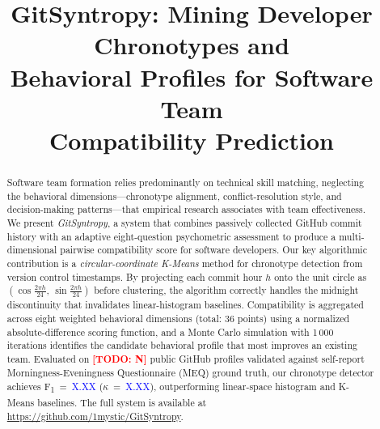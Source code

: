 \documentclass[conference]{IEEEtran}
\newcommand{\TODO}[1]{\textcolor{red}{\textbf{[TODO: #1]}}}
\newcommand{\RESULT}[1]{\textcolor{blue}{#1}}   %
\begin{document}
\title{GitSyntropy: Mining Developer Chronotypes and\\
       Behavioral Profiles for Software Team\\
       Compatibility Prediction}

\author{
}

\maketitle

\begin{abstract}
Software team formation relies predominantly on technical skill
matching, neglecting the behavioral dimensions—chronotype alignment,
conflict-resolution style, and decision-making patterns—that empirical
research associates with team effectiveness.
We present \textit{GitSyntropy}, a system that combines passively
collected GitHub commit history with an adaptive eight-question
psychometric assessment to produce a multi-dimensional pairwise
compatibility score for software developers.
Our key algorithmic contribution is a \emph{circular-coordinate
K-Means} method for chronotype detection from version control
timestamps.
By projecting each commit hour $h$ onto the unit circle as
$(\cos\!\tfrac{2\pi h}{24},\,\sin\!\tfrac{2\pi h}{24})$ before
clustering, the algorithm correctly handles the midnight discontinuity
that invalidates linear-histogram baselines.
Compatibility is aggregated across eight weighted behavioral dimensions
(total: 36 points) using a normalized absolute-difference scoring
function, and a Monte Carlo simulation with 1\,000 iterations
identifies the candidate behavioral profile that most improves an
existing team.
Evaluated on \TODO{N} public GitHub profiles validated against
self-report Morningness-Eveningness Questionnaire (MEQ) ground truth,
our chronotype detector achieves F\textsubscript{1}~=~\RESULT{X.XX}
($\kappa$~=~\RESULT{X.XX}), outperforming linear-space histogram and
K-Means baselines.
The full system is available at
\url{https://github.com/1mystic/GitSyntropy}.
\end{abstract}
\end{document}
